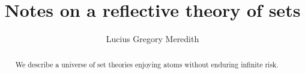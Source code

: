 \def\lastname{Meredith}

\title{Notes on a reflective theory of sets}

\author{ Lucius Gregory Meredith
}
 

\maketitle              %


\begin{abstract}

  We describe a universe of set theories enjoying atoms without enduring infinite risk.

\end{abstract}



